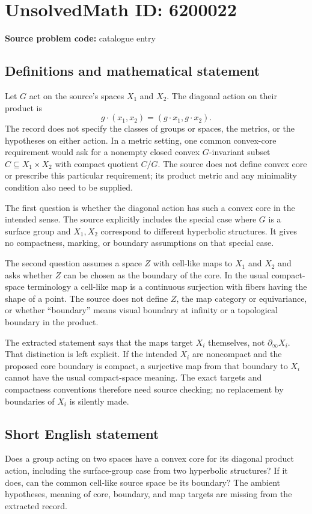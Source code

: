 \documentclass[11pt]{article}
\begin{document}
\section*{UnsolvedMath ID: 6200022}
\textbf{Source problem code:} catalogue entry
\subsection{Definitions and mathematical statement}
Let $G$ act on the source's spaces $X_1$ and $X_2$. The diagonal action on their product is
\[
 g\cdot(x_1,x_2)=(g\cdot x_1,g\cdot x_2).
\]
The record does not specify the classes of groups or spaces, the metrics, or the hypotheses on either action. In a metric setting, one common convex-core requirement would ask for a nonempty closed convex $G$-invariant subset $C\subseteq X_1\times X_2$ with compact quotient $C/G$. The source does not define convex core or prescribe this particular requirement; its product metric and any minimality condition also need to be supplied.

The first question is whether the diagonal action has such a convex core in the intended sense. The source explicitly includes the special case where $G$ is a surface group and $X_1,X_2$ correspond to different hyperbolic structures. It gives no compactness, marking, or boundary assumptions on that special case.

The second question assumes a space $Z$ with cell-like maps to $X_1$ and $X_2$ and asks whether $Z$ can be chosen as the boundary of the core. In the usual compact-space terminology a cell-like map is a continuous surjection with fibers having the shape of a point. The source does not define $Z$, the map category or equivariance, or whether ``boundary'' means visual boundary at infinity or a topological boundary in the product.

The extracted statement says that the maps target $X_i$ themselves, not $\partial_\infty X_i$. That distinction is left explicit. If the intended $X_i$ are noncompact and the proposed core boundary is compact, a surjective map from that boundary to $X_i$ cannot have the usual compact-space meaning. The exact targets and compactness conventions therefore need source checking; no replacement by boundaries of $X_i$ is silently made.
\subsection{Short English statement}
Does a group acting on two spaces have a convex core for its diagonal product action, including the surface-group case from two hyperbolic structures? If it does, can the common cell-like source space be its boundary? The ambient hypotheses, meaning of core, boundary, and map targets are missing from the extracted record.
\end{document}
